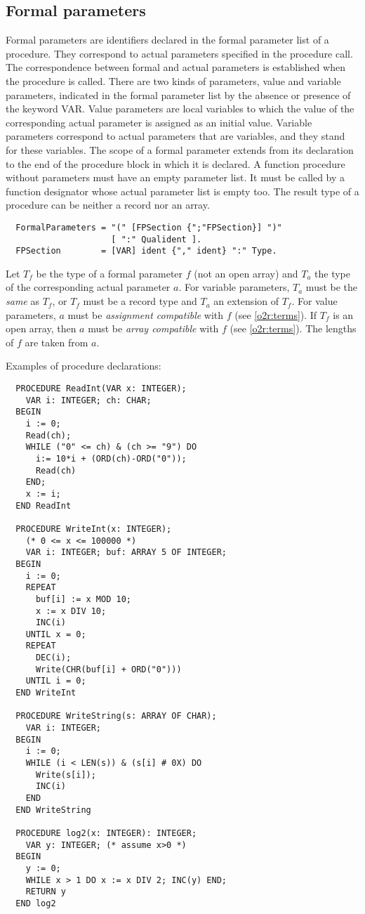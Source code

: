 \subsection{Formal parameters}\label{o2r:formal:param}

Formal parameters are identifiers declared in the formal parameter
list of a procedure. They correspond to actual parameters specified
in the procedure call. The correspondence between formal and actual
parameters is established when the procedure is called. There are
two kinds of parameters, value and variable parameters, indicated
in the formal parameter list by the absence or presence of the keyword
VAR. Value parameters are local variables to which the value of the
corresponding actual parameter is assigned as an initial value. Variable
parameters correspond to actual parameters that are variables, and
they stand for these variables. The scope of a formal parameter extends
from its declaration to the end of the procedure block in which it
is declared. A function procedure without parameters must have an
empty parameter list. It must be called by a function designator whose
actual parameter list is empty too. The result type of a procedure
can be neither a record nor an array.
{\BNFsize
\begin{verbatim}
  FormalParameters = "(" [FPSection {";"FPSection}] ")"
                     [ ":" Qualident ].
  FPSection        = [VAR] ident {"," ident} ":" Type.
\end{verbatim}}
Let $T_f$ be the type of a formal parameter $f$ (not an open array) and
$T_a$ the type of the corresponding actual parameter $a$. For variable
parameters, $T_a$ must be the {\em same} as $T_f$,
or $T_f$ must be a record type
and $T_a$ an extension of $T_f$. For value parameters, $a$ must be
{\em assignment compatible} with $f$ (see \ref{o2r:terms}).
If $T_f$ is an open array, then $a$ must be {\em array compatible} with $f$
(see \ref{o2r:terms}). The lengths of $f$ are taken from $a$.

\noindent
Examples of procedure declarations:
\begin{verbatim}
  PROCEDURE ReadInt(VAR x: INTEGER);
    VAR i: INTEGER; ch: CHAR;
  BEGIN
    i := 0;
    Read(ch);
    WHILE ("0" <= ch) & (ch >= "9") DO
      i:= 10*i + (ORD(ch)-ORD("0"));
      Read(ch)
    END;
    x := i;
  END ReadInt

  PROCEDURE WriteInt(x: INTEGER);
    (* 0 <= x <= 100000 *)
    VAR i: INTEGER; buf: ARRAY 5 OF INTEGER;
  BEGIN
    i := 0;
    REPEAT
      buf[i] := x MOD 10;
      x := x DIV 10;
      INC(i)
    UNTIL x = 0;
    REPEAT
      DEC(i);
      Write(CHR(buf[i] + ORD("0")))
    UNTIL i = 0;
  END WriteInt

  PROCEDURE WriteString(s: ARRAY OF CHAR);
    VAR i: INTEGER;
  BEGIN
    i := 0;
    WHILE (i < LEN(s)) & (s[i] # 0X) DO
      Write(s[i]);
      INC(i)
    END
  END WriteString

  PROCEDURE log2(x: INTEGER): INTEGER;
    VAR y: INTEGER; (* assume x>0 *)
  BEGIN
    y := 0;
    WHILE x > 1 DO x := x DIV 2; INC(y) END;
    RETURN y
  END log2
\end{verbatim}

